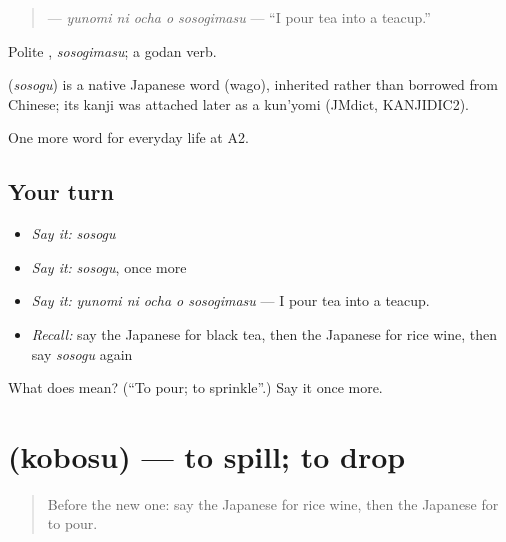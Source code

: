 \begin{quote}
\textbf{  } — \emph{yunomi ni ocha o sosogimasu} — \textquotedblleft{}I pour tea into a teacup.\textquotedblright{}
\end{quote}

Polite \textbf{}, \emph{sosogimasu}; a godan verb.

\begin{cousinweb}
\textbf{} (\emph{sosogu}) is a native Japanese word (wago), inherited rather than borrowed from Chinese; its kanji was attached later as a kun'yomi (JMdict, KANJIDIC2).
\end{cousinweb}

\begin{grammarlens}[title={What you've built}]
One more word for everyday life at A2.
\end{grammarlens}

\subsection*{Your turn}
\begin{itemize}
\raggedright
  \item \emph{Say it:} \emph{sosogu}
  \item \emph{Say it:} \emph{sosogu}, once more
  \item \emph{Say it:} \emph{yunomi ni ocha o sosogimasu} — I pour tea into a teacup.
  \item \emph{Recall:} say the Japanese for black tea, then the Japanese for rice wine, then say \emph{sosogu} again
\end{itemize}

\begin{tcolorbox}[breakable,colback=teal!4,colframe=teal!35!black,title={Before you move on}]
What does  mean? (\textquotedblleft{}To pour; to sprinkle\textquotedblright{}.) Say it once more.
\end{tcolorbox}
\section[\texorpdfstring{\ja{こぼす} (kobosu)}{こぼす (kobosu)}]{ (kobosu) — to spill; to drop}

\label{lesson:JA-C179-kobosu}



\begin{quote}
Before the new one: say the Japanese for rice wine, then the Japanese for to pour.
\end{quote}

